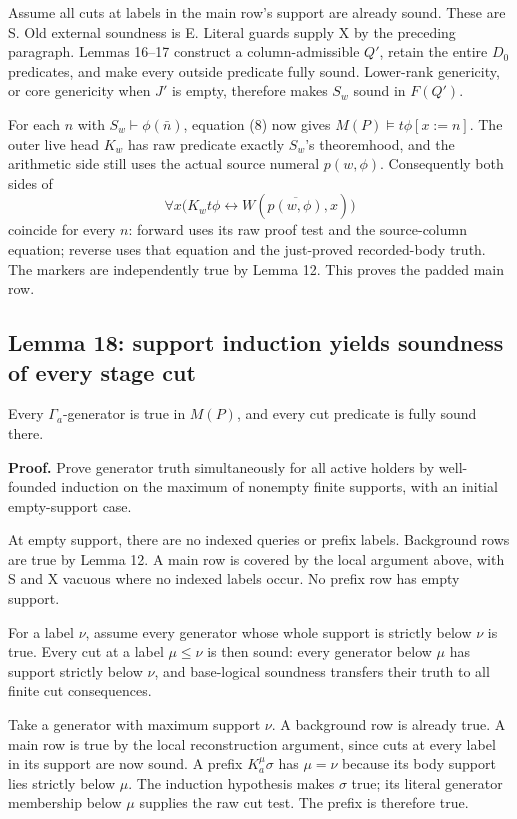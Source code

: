 \documentclass[
  11pt,
  letterpaper,
]{article}
\newcounter{none} %
\begin{document}
Assume all cuts at labels in the main row's support are already sound.
These are S. Old external soundness is E. Literal guards supply X by the
preceding paragraph. Lemmas 16--17 construct a column-admissible \(Q'\),
retain the entire \(D_0\) predicates, and make every outside predicate
fully sound. Lower-rank genericity, or core genericity when \(J'\) is
empty, therefore makes \(S_w\) sound in \(F(Q')\).

For each \(n\) with \(S_w\vdash\phi(\bar n)\), equation (8) now gives
\(M(P)\models t\phi[x:=n]\). The outer live head \(K_w\) has raw
predicate exactly \(S_w\)'s theoremhood, and the arithmetic side still
uses the actual source numeral \(p(w,\phi)\). Consequently both sides of
\[
\forall x\bigl(K_wt\phi\leftrightarrow
W(\overline{p(w,\phi)},x)\bigr)
\] coincide for every \(n\): forward uses its raw proof test and the
source-column equation; reverse uses that equation and the just-proved
recorded-body truth. The markers are independently true by Lemma 12.
This proves the padded main row.

\subsection{Lemma 18: support induction yields soundness of every stage
cut}\label{lemma-18-support-induction-yields-soundness-of-every-stage-cut}

Every \(\Gamma_a\)-generator is true in \(M(P)\), and every cut
predicate is fully sound there.

\textbf{Proof.} Prove generator truth simultaneously for all active
holders by well-founded induction on the maximum of nonempty finite
supports, with an initial empty-support case.

At empty support, there are no indexed queries or prefix labels.
Background rows are true by Lemma 12. A main row is covered by the local
argument above, with S and X vacuous where no indexed labels occur. No
prefix row has empty support.

For a label \(\nu\), assume every generator whose whole support is
strictly below \(\nu\) is true. Every cut at a label \(\mu\leq\nu\) is
then sound: every generator below \(\mu\) has support strictly below
\(\nu\), and base-logical soundness transfers their truth to all finite
cut consequences.

Take a generator with maximum support \(\nu\). A background row is
already true. A main row is true by the local reconstruction argument,
since cuts at every label in its support are now sound. A prefix
\(K_a^\mu\sigma\) has \(\mu=\nu\) because its body support lies strictly
below \(\mu\). The induction hypothesis makes \(\sigma\) true; its
literal generator membership below \(\mu\) supplies the raw cut test.
The prefix is therefore true.
\end{document}
